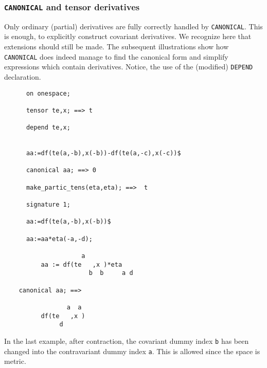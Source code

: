 \subsubsection{\texttt{CANONICAL} and tensor derivatives}

Only ordinary (partial) derivatives are fully correctly handled 
by \texttt{CANONICAL}. This is enough, to explicitly construct covariant 
derivatives. We recognize here  that extensions should still be made.
The subsequent illustrations show how \texttt{CANONICAL} does indeed 
manage to find  the canonical form and simplify  expressions 
which contain derivatives. Notice, the use of 
the (modified) \texttt{DEPEND}  declaration.
\begin{verbatim}
      on onespace;   
 
      tensor te,x; ==> t

      depend te,x;


      aa:=df(te(a,-b),x(-b))-df(te(a,-c),x(-c))$

      canonical aa; ==> 0

      make_partic_tens(eta,eta); ==>  t

      signature 1;

      aa:=df(te(a,-b),x(-b))$

      aa:=aa*eta(-a,-d);

                     a
          aa := df(te   ,x )*eta
                       b  b     a d

    canonical aa; ==>

                 a  a
          df(te   ,x )
               d

\end{verbatim}
In the last example, after contraction, the covariant dummy index \texttt{b}
has been changed into the contravariant dummy index \texttt{a}. This is allowed
since the space is metric. 
